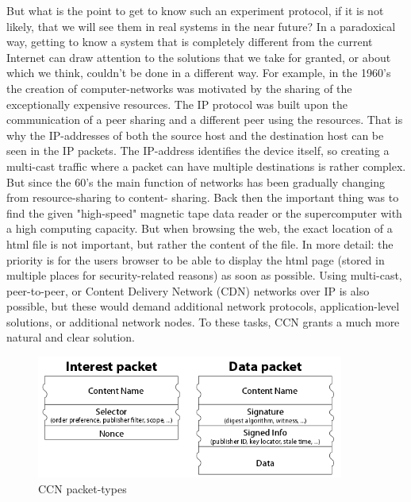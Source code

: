 \documentclass[a4paper]{article}
\begin{document}
But what is the point to get to know such an experiment protocol, if it is not likely, that we will 
see them in real systems in the near future? In a paradoxical way, getting to know a system that is 
completely different from the current Internet can draw attention to the solutions that we take for
granted, or about which we think, couldn't be done in a different way. For example, in the 1960's 
the creation of computer-networks was motivated by the sharing of the exceptionally expensive 
resources. The IP protocol was built upon the communication of a peer sharing and a different peer
using the resources. That is why the IP-addresses of both the source host and the destination 
host can be seen in the IP packets. The IP-address identifies the device itself, so creating a 
multi-cast traffic where a packet can have multiple destinations is rather complex. But since the
60's the main function of networks has been gradually changing from resource-sharing to content-
sharing. Back then the important thing was to find the given "high-speed" magnetic tape data reader
or the supercomputer with a high computing capacity. But when browsing the web, the exact location
of a html file is not important, but rather the content of the file. In more detail: the priority is
for the users browser to be able to display the html page (stored in multiple places for
security-related reasons) as soon as possible. Using multi-cast, peer-to-peer, or Content Delivery Network (CDN) networks over
IP is also possible, but these would demand additional network protocols, application-level solutions,
or additional network nodes. To these tasks, CCN grants a much more natural and clear solution.

\begin{figure}[H]
    \centering
    \includegraphics[width=0.9\textwidth]{figures/ccn-packets.png}
    \caption{CCN packet-types~\cite{CongestionAvoidance}}
    \label{fig:CCN-packet-types}
\end{figure}
\end{document}
